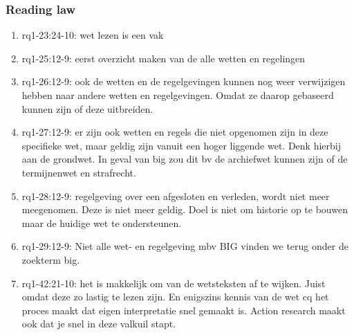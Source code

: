 \subsubsection{Reading law}
\begin{comment}
Hoort dit niet bij rq3?
plaats hier de afgehandelde items.
\end{comment}
\begin{enumerate}
    \item rq1-23:24-10: wet lezen is een vak 
    \item rq1-25:12-9: eerst overzicht maken van de alle wetten en regelingen
    \item rq1-26:12-9: ook de wetten en de regelgevingen kunnen nog weer verwijzigen hebben naar andere wetten en regelgevingen. Omdat ze daarop gebaseerd kunnen zijn of deze uitbreiden.
    \item rq1-27:12-9: er zijn ook wetten en regels die niet opgenomen zijn in deze specifieke wet, maar geldig zijn vanuit een hoger liggende wet. 
    Denk hierbij aan de grondwet. 
    In geval van big zou dit bv de archiefwet kunnen zijn of de termijnenwet en strafrecht.
    \item rq1-28:12-9: regelgeving over een afgesloten en verleden, wordt niet meer meegenomen. 
    Deze is niet meer geldig. 
    Doel is niet om historie op te bouwen maar de huidige wet te ondersteunen.
    \item rq1-29:12-9: Niet alle wet- en regelgeving mbv BIG vinden we terug onder de zoekterm big.
    \item rq1-42:21-10: het is makkelijk om van de wetsteksten af te wijken. Juist omdat deze zo lastig te lezen zijn. En enigszins kennis van de wet cq het proces maakt dat eigen interpretatie snel gemaakt is. Action research maakt ook dat je snel in deze valkuil stapt.
\end{enumerate}

